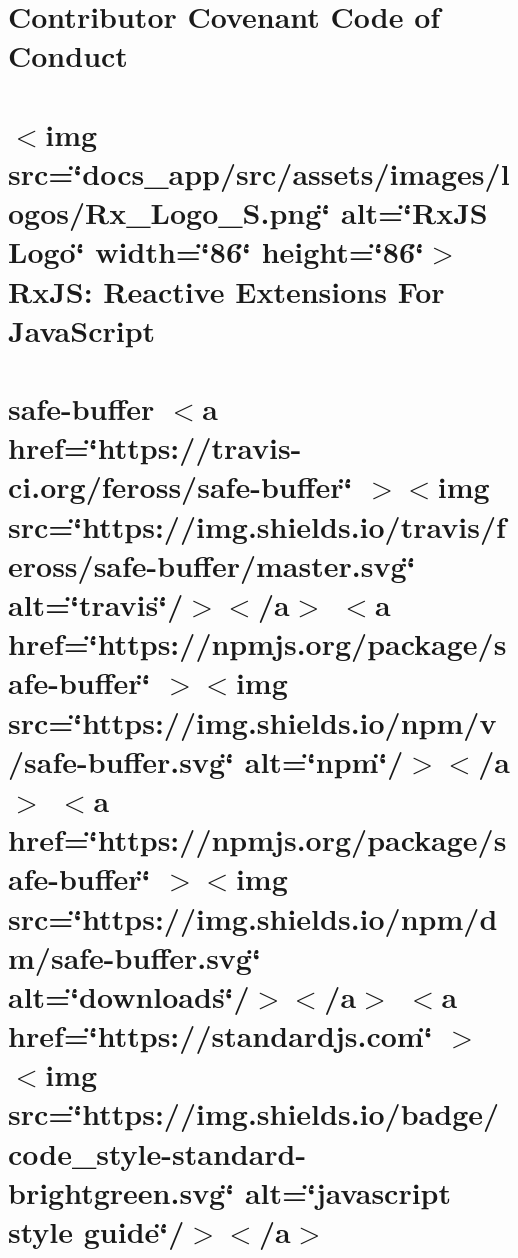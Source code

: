 \documentclass[twoside]{book}
\newcommand{\+}{\discretionary{\mbox{\scriptsize$\hookleftarrow$}}{}{}}
\begin{document}
\chapter{Contributor Covenant Code of Conduct}
\label{md__c___users_vaishnavi_jadhav__desktop__developer_code_mean_stack_example_client_node_modules_rabab0d1aacdb1adc390f81cf82569e01}

\chapter{\texorpdfstring{$<$}{<}img src=\char`\"{}docs\+\_\+app/src/assets/images/logos/\+Rx\+\_\+\+Logo\+\_\+\+S.\+png\char`\"{} alt=\char`\"{}\+Rx\+JS Logo\char`\"{} width=\char`\"{}86\char`\"{} height=\char`\"{}86\char`\"{}\texorpdfstring{$>$}{>} Rx\+JS\+: Reactive Extensions For Java\+Script}
\label{md__c___users_vaishnavi_jadhav__desktop__developer_code_mean_stack_example_client_node_modules_rxjs__r_e_a_d_m_e}

\chapter{safe-\/buffer \texorpdfstring{$<$}{<}a href=\char`\"{}https\+://travis-\/ci.\+org/feross/safe-\/buffer\char`\"{} \texorpdfstring{$>$}{>}\texorpdfstring{$<$}{<}img src=\char`\"{}https\+://img.\+shields.\+io/travis/feross/safe-\/buffer/master.\+svg\char`\"{} alt=\char`\"{}travis\char`\"{}/\texorpdfstring{$>$}{>}\texorpdfstring{$<$}{<}/a\texorpdfstring{$>$}{>} \texorpdfstring{$<$}{<}a href=\char`\"{}https\+://npmjs.\+org/package/safe-\/buffer\char`\"{} \texorpdfstring{$>$}{>}\texorpdfstring{$<$}{<}img src=\char`\"{}https\+://img.\+shields.\+io/npm/v/safe-\/buffer.\+svg\char`\"{} alt=\char`\"{}npm\char`\"{}/\texorpdfstring{$>$}{>}\texorpdfstring{$<$}{<}/a\texorpdfstring{$>$}{>} \texorpdfstring{$<$}{<}a href=\char`\"{}https\+://npmjs.\+org/package/safe-\/buffer\char`\"{} \texorpdfstring{$>$}{>}\texorpdfstring{$<$}{<}img src=\char`\"{}https\+://img.\+shields.\+io/npm/dm/safe-\/buffer.\+svg\char`\"{} alt=\char`\"{}downloads\char`\"{}/\texorpdfstring{$>$}{>}\texorpdfstring{$<$}{<}/a\texorpdfstring{$>$}{>} \texorpdfstring{$<$}{<}a href=\char`\"{}https\+://standardjs.\+com\char`\"{} \texorpdfstring{$>$}{>}\texorpdfstring{$<$}{<}img src=\char`\"{}https\+://img.\+shields.\+io/badge/code\+\_\+style-\/standard-\/brightgreen.\+svg\char`\"{} alt=\char`\"{}javascript style guide\char`\"{}/\texorpdfstring{$>$}{>}\texorpdfstring{$<$}{<}/a\texorpdfstring{$>$}{>}}
\label{md__c___users_vaishnavi_jadhav__desktop__developer_code_mean_stack_example_client_node_modules_safe_buffer__r_e_a_d_m_e}

\end{document}
